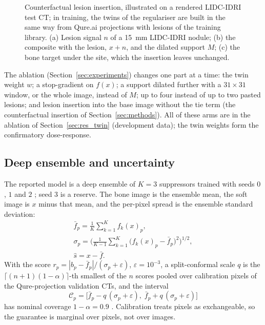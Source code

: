 \begin{figure}[htbp]
\centering
{}
\caption{Counterfactual lesion insertion, illustrated on a rendered LIDC-IDRI test CT; in training, the twins of the regulariser are built in
the same way from Qure.ai projections with lesions of the training library. (a) Lesion signal $n$ of a 15~mm LIDC-IDRI nodule; (b) the
composite with the lesion, $x+n$, and the dilated support $M$; (c) the bone target under the site, which the insertion leaves unchanged.}
\label{fig:insertion}
\end{figure}

The ablation (Section~\ref{sec:experiments}) changes one part at a time: the twin weight $w$; a stop-gradient on $f(x)$; a support dilated further with a
$31\times31$ window, or the whole image, instead of $M$; up to four instead of up to two pasted lesions; and lesion insertion into the base image
without the tie term (the counterfactual insertion of Section~\ref{sec:methods}). All of these arms are in the ablation of
Section~\ref{sec:res_twin} (development data); the twin weights form the confirmatory dose-response.

\subsection{Deep ensemble and uncertainty}
The reported model is a deep ensemble of $K=3$ suppressors trained with seeds $0$, $1$ and $2$ \citep{lakshminarayanan2017ensembles}; seed $3$ is a reserve.
The bone image is the ensemble mean, the soft image is $x$ minus that mean, and the per-pixel spread is the ensemble standard deviation:
\begin{equation}
\begin{gathered}
\bar f_p=\frac1K\sum_{k=1}^{K}f_k(x)_p,\\
\sigma_p=\Big(\frac{1}{K-1}\sum_{k=1}^{K}\big(f_k(x)_p-\bar f_p\big)^2\Big)^{1/2},\\
\hat s=x-\bar f.
\end{gathered}
\label{eq:ensemble}
\end{equation}
With the score $r_p=|b_p-\bar f_p|/(\sigma_p+\varepsilon)$, $\varepsilon=10^{-3}$, a split-conformal scale $q$ is the
$\lceil (n+1)(1-\alpha)\rceil$-th smallest of the $n$ scores pooled over calibration pixels of the Qure-projection validation CTs, and the
interval
\begin{equation}
\mathcal{C}_p=\big[\bar f_p-q\,(\sigma_p+\varepsilon),\;\bar f_p+q\,(\sigma_p+\varepsilon)\big]
\label{eq:conformal}
\end{equation}
has nominal coverage $1-\alpha=0.9$ \citep{lei2018conformal,angelopoulos2023conformal}. Calibration treats pixels as exchangeable, so the
guarantee is marginal over pixels, not over images.

